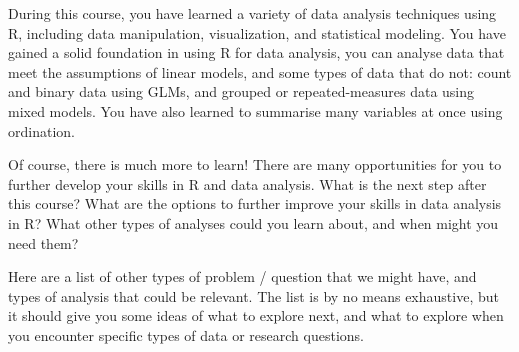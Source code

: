 \documentclass[
  letterpaper,
  8pt,
  a4paper]{book}
\begin{document}
During this course, you have learned a variety of data analysis
techniques using R, including data manipulation, visualization, and
statistical modeling. You have gained a solid foundation in using R for
data analysis, you can analyse data that meet the assumptions of linear
models, and some types of data that do not: count and binary data using
GLMs, and grouped or repeated-measures data using mixed models. You have
also learned to summarise many variables at once using ordination.

Of course, there is much more to learn! There are many opportunities for
you to further develop your skills in R and data analysis. What is the
next step after this course? What are the options to further improve
your skills in data analysis in R? What other types of analyses could
you learn about, and when might you need them?

Here are a list of other types of problem / question that we might have,
and types of analysis that could be relevant. The list is by no means
exhaustive, but it should give you some ideas of what to explore next,
and what to explore when you encounter specific types of data or
research questions.
\end{document}
